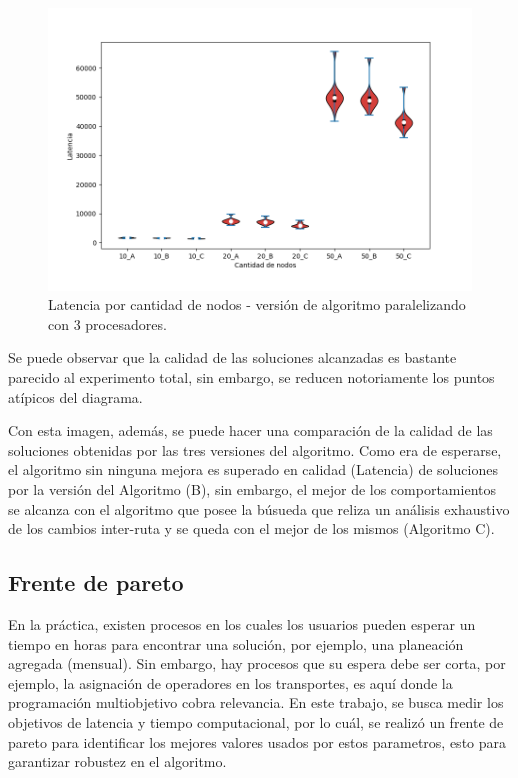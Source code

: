 \documentclass[review]{elsarticle}
\begin{document}
	 \begin{figure}[h!]
	\centering
	\includegraphics[width=0.7\linewidth]{3latencia.png}
	\caption{Latencia por cantidad de nodos - versión de algoritmo paralelizando con 3 procesadores.}
	\label{fig:imagen4}
	
\end{figure}

Se puede observar que la calidad de las soluciones alcanzadas es bastante parecido al experimento total, sin embargo, se reducen notoriamente los puntos atípicos del diagrama. 

Con esta imagen, además, se puede hacer una comparación de la calidad de las soluciones obtenidas por las tres versiones del algoritmo. Como era de esperarse, el algoritmo sin ninguna mejora es superado en calidad (Latencia) de soluciones por la versión del Algoritmo (B), sin embargo, el mejor de los comportamientos se alcanza con el algoritmo que posee la búsueda que reliza un análisis exhaustivo de los cambios inter-ruta y se queda con el mejor de los mismos (Algoritmo C).

\subsection{Frente de pareto}

En la práctica, existen procesos en los cuales los usuarios pueden esperar un tiempo en horas para encontrar una solución, por ejemplo, una planeación agregada (mensual). Sin embargo, hay procesos que su espera debe ser corta, por ejemplo, la asignación de operadores en los transportes, es aquí donde la programación multiobjetivo cobra relevancia. En este trabajo, se busca medir los objetivos de latencia y tiempo computacional, por lo cuál, se realizó un frente de pareto para  identificar los mejores valores usados por estos parametros, esto para garantizar robustez en el algoritmo. 
\end{document}
